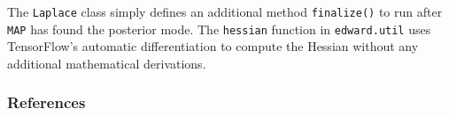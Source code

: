 The \texttt{Laplace} class simply defines an additional method
\texttt{finalize()} to
run after \texttt{MAP} has found the posterior mode. The
\texttt{hessian} function in \texttt{edward.util} uses TensorFlow's
automatic differentiation to compute the Hessian without any
additional mathematical derivations.

\subsubsection{References}\label{references}

